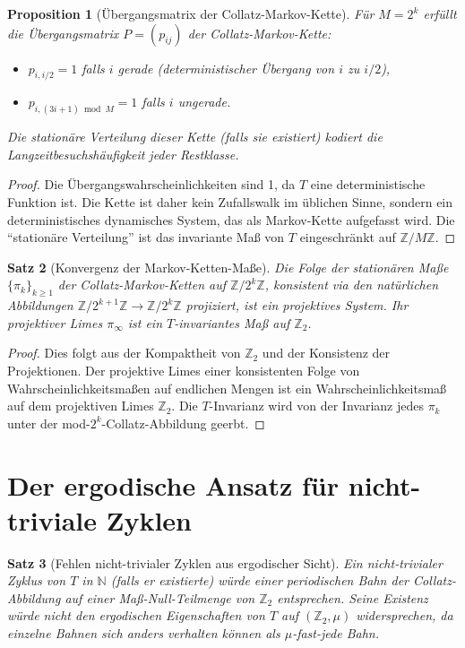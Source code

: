 \documentclass[12pt,a4paper]{article}
\newtheorem{theorem}{Satz}[section]
\newtheorem{proposition}[theorem]{Proposition}
\begin{document}
\begin{proposition}[Übergangsmatrix der Collatz-Markov-Kette]\label{prop:uebergang}
Für $M = 2^k$ erfüllt die Übergangsmatrix $P = (p_{ij})$ der Collatz-Markov-Kette:
\begin{itemize}
  \item $p_{i,i/2} = 1$ falls $i$ gerade (deterministischer Übergang von $i$ zu $i/2$),
  \item $p_{i, (3i+1) \bmod M} = 1$ falls $i$ ungerade.
\end{itemize}
Die stationäre Verteilung dieser Kette (falls sie existiert) kodiert die Langzeitbesuchshäufigkeit
jeder Restklasse.
\end{proposition}

\begin{proof}
Die Übergangswahrscheinlichkeiten sind 1, da $T$ eine deterministische Funktion ist.
Die Kette ist daher kein Zufallswalk im üblichen Sinne, sondern ein deterministisches
dynamisches System, das als Markov-Kette aufgefasst wird. Die ``stationäre Verteilung''
ist das invariante Maß von $T$ eingeschränkt auf $\mathbb{Z}/M\mathbb{Z}$.
\end{proof}

\begin{theorem}[Konvergenz der Markov-Ketten-Maße]\label{thm:markov_konv}
Die Folge der stationären Maße $\{\pi_k\}_{k \geq 1}$ der Collatz-Markov-Ketten auf
$\mathbb{Z}/2^k\mathbb{Z}$, konsistent via den natürlichen Abbildungen
$\mathbb{Z}/2^{k+1}\mathbb{Z} \to \mathbb{Z}/2^k\mathbb{Z}$ projiziert, ist ein
projektives System. Ihr projektiver Limes $\pi_\infty$ ist ein $T$-invariantes Maß auf
$\mathbb{Z}_2$.
\end{theorem}

\begin{proof}
Dies folgt aus der Kompaktheit von $\mathbb{Z}_2$ und der Konsistenz der Projektionen.
Der projektive Limes einer konsistenten Folge von Wahrscheinlichkeitsmaßen auf
endlichen Mengen ist ein Wahrscheinlichkeitsmaß auf dem projektiven Limes $\mathbb{Z}_2$.
Die $T$-Invarianz wird von der Invarianz jedes $\pi_k$ unter der mod-$2^k$-Collatz-Abbildung
geerbt.
\end{proof}

\section{Der ergodische Ansatz für nicht-triviale Zyklen}

\begin{theorem}[Fehlen nicht-trivialer Zyklen aus ergodischer Sicht]\label{thm:keine_zyklen}
Ein nicht-trivialer Zyklus von $T$ in $\mathbb{N}$ (falls er existierte) würde einer
periodischen Bahn der Collatz-Abbildung auf einer Maß-Null-Teilmenge von $\mathbb{Z}_2$
entsprechen. Seine Existenz würde nicht den ergodischen Eigenschaften von $T$ auf
$(\mathbb{Z}_2, \mu)$ widersprechen, da einzelne Bahnen sich anders verhalten können
als $\mu$-fast-jede Bahn.
\end{theorem}
\end{document}
